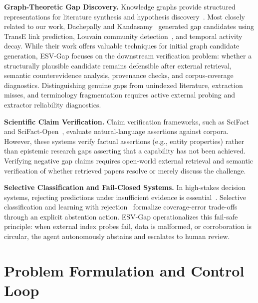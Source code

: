 \documentclass[runningheads]{llncs}
\newcommand{\method}{ESV-Gap}
\begin{document}
\noindent\textbf{Graph-Theoretic Gap Discovery.} Knowledge graphs provide structured representations for literature synthesis and hypothesis discovery~\cite{swanson1986fish,schneider2022decade,chen2019ukge}. Most closely related to our work, Dachepally and Kandasamy~\cite{rahul2026dynamic} generated gap candidates using TransE link prediction, Louvain community detection~\cite{blondel2008fast}, and temporal activity decay. While their work offers valuable techniques for initial graph candidate generation, \method{} focuses on the downstream verification problem: whether a structurally plausible candidate remains defensible after external retrieval, semantic counterevidence analysis, provenance checks, and corpus-coverage diagnostics. Distinguishing genuine gaps from unindexed literature, extraction misses, and terminology fragmentation requires active external probing and extractor reliability diagnostics.

\noindent\textbf{Scientific Claim Verification.} Claim verification frameworks, such as SciFact~\cite{wadden2020scifact} and SciFact-Open~\cite{wadden2022scifactopen}, evaluate natural-language assertions against corpora. However, these systems verify factual assertions (e.g., entity properties) rather than epistemic research gaps asserting that a capability has not been achieved. Verifying negative gap claims requires open-world external retrieval and semantic verification of whether retrieved papers resolve or merely discuss the challenge.

\noindent\textbf{Selective Classification and Fail-Closed Systems.} In high-stakes decision systems, rejecting predictions under insufficient evidence is essential~\cite{saltzer1975protection,shneiderman2020hcai}. Selective classification and learning with rejection~\cite{cortes2016learning,geifman2017selective} formalize coverage-error trade-offs through an explicit abstention action. \method{} operationalizes this fail-safe principle: when external index probes fail, data is malformed, or corroboration is circular, the agent autonomously abstains and escalates to human review.

\section{Problem Formulation and Control Loop}
\label{sec:problem}
\end{document}
